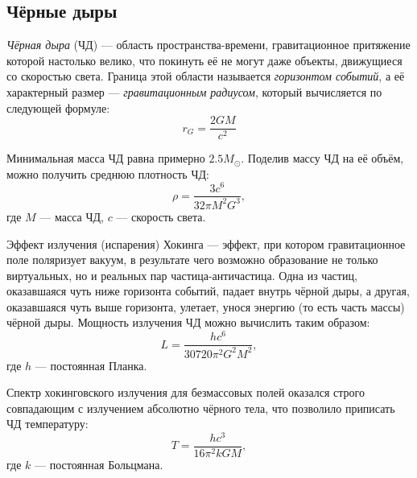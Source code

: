 \subsection{Чёрные дыры}
\textit{Чёрная дыра} (ЧД) --- область пространства-времени, гравитационное притяжение которой настолько велико, что покинуть её не могут даже объекты, движущиеся со скоростью света. Граница этой области называется \textit{горизонтом событий}, а её характерный размер --- \textit{гравитационным радиусом}, который вычисляется по следующей формуле:
\begin{equation}
r_G=\frac{2GM}{c^2}
\end{equation}

Минимальная масса ЧД равна примерно $2.5M_{\odot}$. Поделив массу ЧД на её объём, можно получить среднюю плотность ЧД:
\begin{equation}
\rho=\frac{3c^6}{32\pi M^2G^3},
\end{equation}
где $M$ --- масса ЧД, $c$ --- скорость света.

Эффект излучения (испарения) Хокинга --- эффект, при котором гравитационное поле поляризует вакуум, в результате чего возможно образование не только виртуальных, но и реальных пар частица-античастица. Одна из частиц, оказавшаяся чуть ниже горизонта событий, падает внутрь чёрной дыры, а другая, оказавшаяся чуть выше горизонта, улетает, унося энергию (то есть часть массы) чёрной дыры. Мощность излучения ЧД можно вычислить таким образом:
\begin{equation}
L=\frac{hc^6}{30720\pi^2G^2M^2},
\end{equation}
где $h$ --- постоянная Планка.

Спектр хокинговского излучения для безмассовых полей оказался строго совпадающим с излучением абсолютно чёрного тела, что позволило приписать ЧД температуру:
\begin{equation}
T=\frac{hc^3}{16\pi^2kGM},
\end{equation}
где $k$ --- постоянная Больцмана.